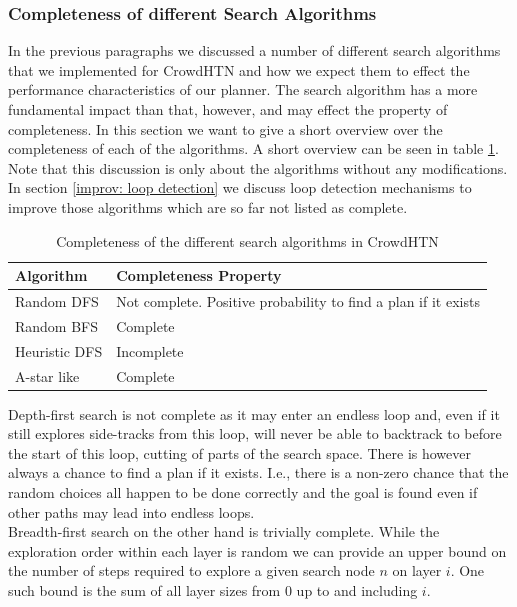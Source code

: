 \subsubsection{Completeness of different Search Algorithms}
\label{improv: search completeness}
In the previous paragraphs we discussed a number of different search algorithms that we implemented for CrowdHTN and how we expect them to effect the performance characteristics of our planner. The search algorithm has a more fundamental impact than that, however, and may effect the property of completeness. In this section we want to give a short overview over the completeness of each of the algorithms. A short overview can be seen in table \ref{table: search completeness}. Note that this discussion is only about the algorithms without any modifications. In section \ref{improv: loop detection} we discuss loop detection mechanisms to improve those algorithms which are so far not listed as complete. \\
\begin{table}
	\caption{Completeness of the different search algorithms in CrowdHTN}
	\label{table: search completeness}
	\centering
	\begin{tabular}{| l | l |}
		\hline
		Algorithm & Completeness Property \\
		\hline
		Random DFS & Not complete. Positive probability to find a plan if it exists \\
		Random BFS & Complete \\
		Heuristic DFS & Incomplete \\
		A-star like & Complete \\
		\hline
	\end{tabular}
\end{table}
Depth-first search is not complete as it may enter an endless loop and, even if it still explores side-tracks from this loop, will never be able to backtrack to before the start of this loop, cutting of parts of the search space. There is however always a chance to find a plan if it exists. I.e., there is a non-zero chance that the random choices all happen to be done correctly and the goal is found even if other paths may lead into endless loops. \\
Breadth-first search on the other hand is trivially complete. While the exploration order within each layer is random we can provide an upper bound on the number of steps required to explore a given search node $n$ on layer $i$. One such bound is the sum of all layer sizes from 0 up to and including $i$. \\
